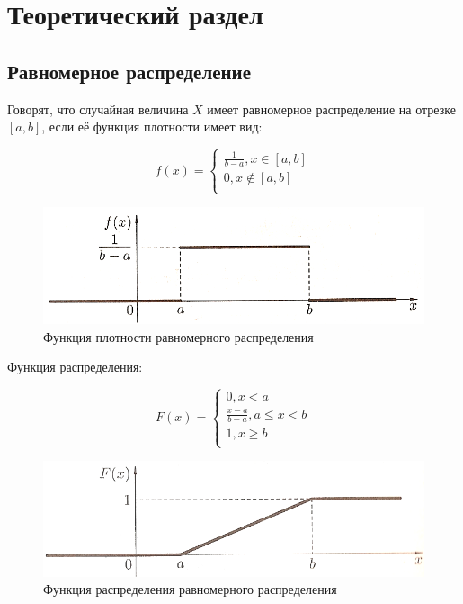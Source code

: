 \chapter{Теоретический раздел}

\section{Равномерное распределение}
    
Говорят, что случайная величина $X$ имеет равномерное распределение на отрезке $[a,b]$, если её функция плотности имеет вид:

\begin{equation}
    f (x) =
    \begin{cases}
        \frac{1}{b-a}, x \in [a,b] \\
        0, x \notin [a, b] \\
    \end{cases}
\end{equation}

\begin{figure}[H]
    \begin{center}
    \includegraphics[width=0.5\linewidth]{inc/uni_f.png}
    \caption{Функция плотности равномерного распределения}
    \label{fig:}
    \end{center}
\end{figure}

Функция распределения:

\begin{equation}
F (x) =
    \begin{cases}
        0, x < a \\
        \frac{x - a}{b - a}, a \le x < b \\
        1, x \geq b \\
    \end{cases}
\end{equation}

\begin{figure}[H]
    \begin{center}
    \includegraphics[width=0.5\linewidth]{inc/uni_Fx.png}
    \caption{Функция распределения равномерного распределения}
    \label{fig:}
    \end{center}
\end{figure}

